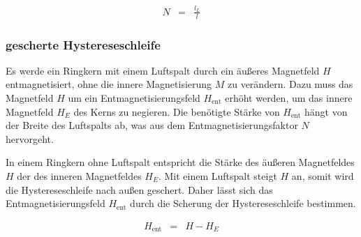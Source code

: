 \documentclass[12pt,a4paper]{scrartcl}
\numberwithin{equation}{section} %
\renewcommand{\[}{} %
\renewcommand{\]}{\noindent} %
\begin{document}
\[
\begin{eqnarray}
    N &=& \frac{l_L}{l}
\end{eqnarray}
\]

\hypertarget{gescherte-hystereseschleife}{%
\subsubsection{gescherte
Hystereseschleife}\label{gescherte-hystereseschleife}}

Es werde ein Ringkern mit einem Luftspalt durch ein äußeres Magnetfeld
\(H\) entmagnetisiert, ohne die innere Magnetisierung \(M\) zu
verändern. Dazu muss das Magnetfeld \(H\) um ein Entmagnetisierungsfeld
\(H_\mathrm{ent}\) erhöht werden, um das innere Magnetfeld \(H_E\) des
Kerns zu negieren. Die benötigte Stärke von \(H_\mathrm{ent}\) hängt von
der Breite des Luftspalts ab, was aus dem Entmagnetisierungsfaktor \(N\)
hervorgeht.

In einem Ringkern ohne Luftspalt entspricht die Stärke des äußeren
Magnetfeldes \(H\) der des inneren Magnetfeldes \(H_E\). Mit einem
Luftspalt steigt \(H\) an, somit wird die Hystereseschleife nach außen
geschert. Daher lässt sich das Entmagnetisierungsfeld \(H_\mathrm{ent}\)
durch die Scherung der Hystereseschleife bestimmen.

\[
\begin{eqnarray}
    H_\mathrm{ent} &=& H - H_E
\end{eqnarray}
\]
\end{document}
